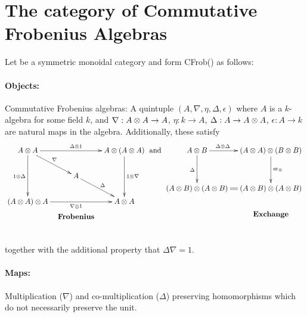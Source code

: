 \section{The category of Commutative Frobenius Algebras} %
\label{sec:the_category_of_commutative_frobenius_algebras}
\begin{example}\label{example:commfrob}
  Let \X be a symmetric monoidal category and form CFrob(\X) as follows: \paragraph{Objects:}
  Commutative Frobenius algebras\cite{kock04}: A quintuple $(A,\nabla,\eta,\Delta,\epsilon)$ where
  $A$ is a $k$-algebra for some field $k$, and $\nabla :A\otimes A \to A$, $\eta:k\to A$, $\Delta : A \to
  A\otimes A$, $\epsilon : A \to k$ are natural maps in the algebra. Additionally, these satisfy
  \[
    \xymatrix @C=10pt @R=20pt{
      A \* A \ar[dd]_{1\*\Delta} \ar[dr]^{\nabla}
        \ar[rr]^{\Delta \* 1} & &
        A \* (A \* A) \ar[dd]^{1 \* \nabla}\\
      & A \ar[dr]^{\Delta} & \\
      (A \* A) \* A \ar[rr]_{\nabla \* 1} & &
        A \* A\\
      &*!<0pc,-25pt>{\text{\textbf{Frobenius}}}
    }\text{ and }
    \xymatrix @C=10pt @R=35pt{
      A \* B \ar[d]_{\Delta}
      \ar[r]^(.35){\Delta \* \Delta} &
      (A \* A) \* (B \* B) \ar[d]^{\excs}\\
      (A \* B) \* (A \* B) \ar@{=}[r] &
      (A \* B) \* (A \* B)\\
      &*!<0pc,-25pt>{\text{\textbf{Exchange}}}
    }
  \]
  together with the additional property that $\Delta \nabla = 1$.

  \paragraph{Maps:} Multiplication ($\nabla$) and co-multiplication ($\Delta$) preserving
  homomorphisms which do not necessarily preserve the unit.
\end{example}

